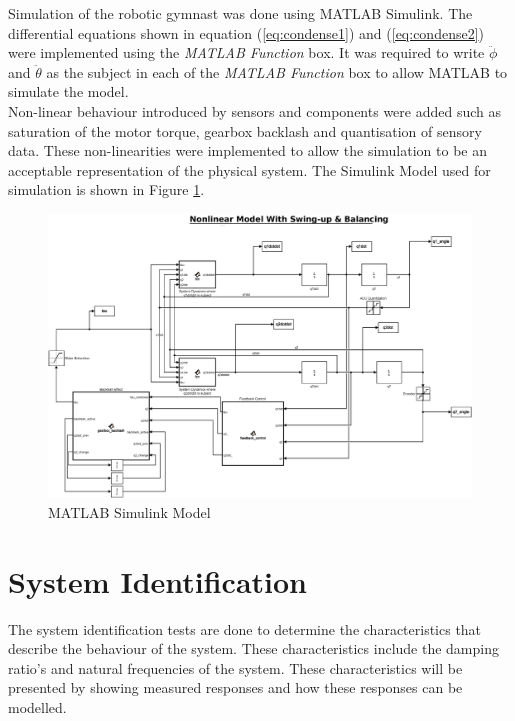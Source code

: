 Simulation of the robotic gymnast was done using MATLAB Simulink. The differential equations shown in equation (\ref{eq:condense1}) and (\ref{eq:condense2}) were implemented using the \textit{MATLAB Function} box. It was required to write $\ddot{\phi}$ and $\ddot{\theta}$ as the subject in each of the \textit{MATLAB Function} box to allow MATLAB to simulate the model.\\

Non-linear behaviour introduced by sensors and components were added such as saturation of the motor torque, gearbox backlash and quantisation of sensory data. These non-linearities were implemented to allow the simulation to be an acceptable representation of the physical system. The Simulink Model used for simulation is shown in Figure \ref{fig:sim_nonlinearfeedback}.

\begin{figure}[h]
	\centering
	\includegraphics[scale=0.3]{./figs/simulink/simulink_model.eps}
	\caption{MATLAB Simulink Model}
	\label{fig:sim_nonlinearfeedback}
\end{figure}

\section{System Identification}

The system identification tests are done to determine the characteristics that describe the behaviour of the system. These characteristics include the damping ratio's and natural frequencies of the system. These characteristics will be presented by showing measured responses and how these responses can be modelled. \\

